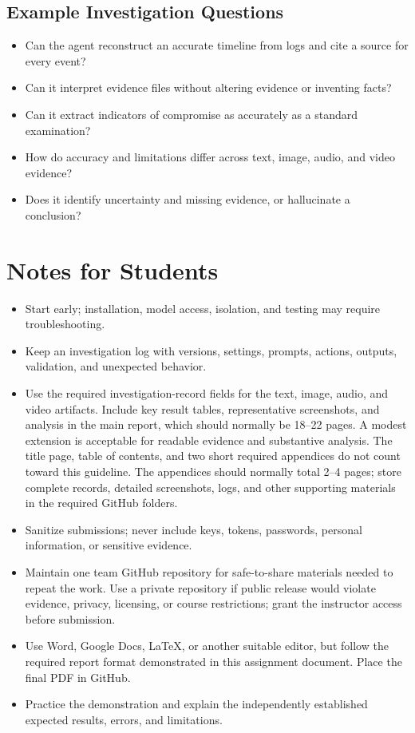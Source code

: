 \documentclass[12pt,letterpaper]{article}
\begin{document}
\subsection{Example Investigation Questions}
\begin{itemize}
    \item Can the agent reconstruct an accurate timeline from logs and cite a source for every event?
    \item Can it interpret evidence files without altering evidence or inventing facts?
    \item Can it extract indicators of compromise as accurately as a standard examination?
    \item How do accuracy and limitations differ across text, image, audio, and video evidence?
    \item Does it identify uncertainty and missing evidence, or hallucinate a conclusion?
\end{itemize}

\section{Notes for Students}
\begin{itemize}
    \item Start early; installation, model access, isolation, and testing may require troubleshooting.
    \item Keep an investigation log with versions, settings, prompts, actions, outputs, validation, and unexpected behavior.
    \item Use the required investigation-record fields for the text, image, audio, and video artifacts. Include key result tables, representative screenshots, and analysis in the main report, which should normally be 18--22 pages. A modest extension is acceptable for readable evidence and substantive analysis. The title page, table of contents, and two short required appendices do not count toward this guideline. The appendices should normally total 2--4 pages; store complete records, detailed screenshots, logs, and other supporting materials in the required GitHub folders.
    \item Sanitize submissions; never include keys, tokens, passwords, personal information, or sensitive evidence.
    \item Maintain one team GitHub repository for safe-to-share materials needed to repeat the work. Use a private repository if public release would violate evidence, privacy, licensing, or course restrictions; grant the instructor access before submission.
    \item Use Word, Google Docs, LaTeX, or another suitable editor, but follow the required report format demonstrated in this assignment document. Place the final PDF in GitHub.
    \item Practice the demonstration and explain the independently established expected results, errors, and limitations.
\end{itemize}
\end{document}
